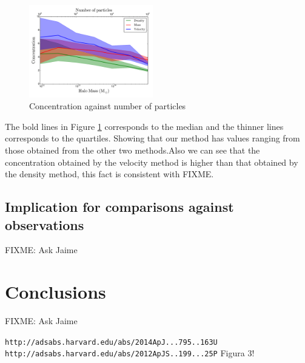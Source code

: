 \documentclass[useAMS,usenatbib]{mn2e}
\begin{document}
\begin{figure}
\begin{center}
  \includegraphics[width=0.48\textwidth]{concentration.pdf}
\end{center}
\caption{Concentration against number of particles
    \label{fig:concentrations}}
\end{figure}

The bold lines in Figure \ref{fig:concentrations} corresponds to the median and the thinner lines corresponds to the quartiles. Showing that our method has values ​​ranging from those obtained from the other two methods.Also we can see that the concentration obtained by the velocity method is higher than that obtained by the density method, this fact is consistent with FIXME.
\subsection{Implication for comparisons against observations}
FIXME: Ask Jaime

\section{Conclusions}
\label{sec:conclusions}
FIXME: Ask Jaime




\verb"http://adsabs.harvard.edu/abs/2014ApJ...795..163U"
\verb"http://adsabs.harvard.edu/abs/2012ApJS..199...25P" Figura 3!
\end{document}
